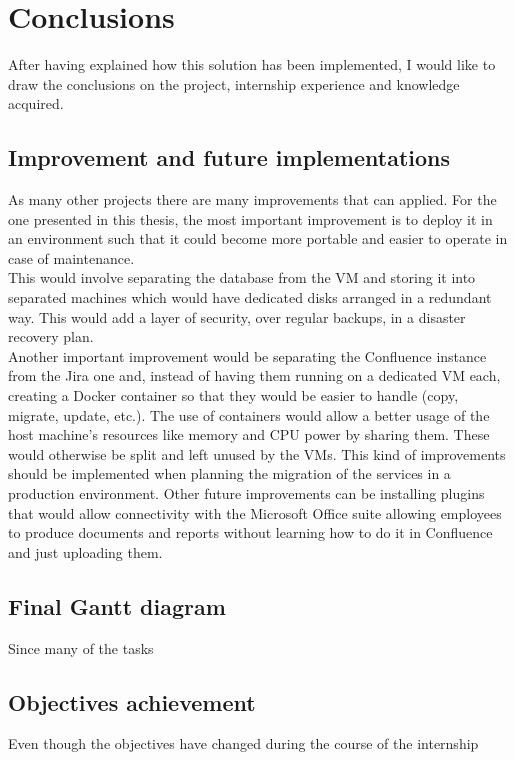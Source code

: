 \chapter{Conclusions}
\label{conclusions}

After having explained how this solution has been implemented, I would like to draw the conclusions on the project, internship experience and knowledge acquired.

\section{Improvement and future implementations}
	As many other projects there are many improvements that can applied.
	For the one presented in this thesis, the most important improvement is to deploy it in an environment such that it could become more portable and easier to operate in case of maintenance.\\
	This would involve separating the database from the VM and storing it into separated machines which would have dedicated disks arranged in a redundant way.
	This would add a layer of security, over regular backups, in a disaster recovery plan.\\
	Another important improvement would be separating the Confluence instance from the Jira one and, instead of having them running on a dedicated VM each, creating a Docker container so that they would be easier to handle (copy, migrate, update, etc.).
	The use of containers would allow a better usage of the host machine's resources like memory and CPU power by sharing them.
	These would otherwise be split and left unused by the VMs.
	This kind of improvements should be implemented when planning the migration of the services in a production environment.
	Other future improvements can be installing plugins that would allow connectivity with the Microsoft Office suite allowing employees to produce documents and reports without learning how to do it in Confluence and just uploading them.

\section{Final Gantt diagram}
	
	Since many of the tasks

%	
\section{Objectives achievement}
	Even though the objectives have changed during the course of the internship

